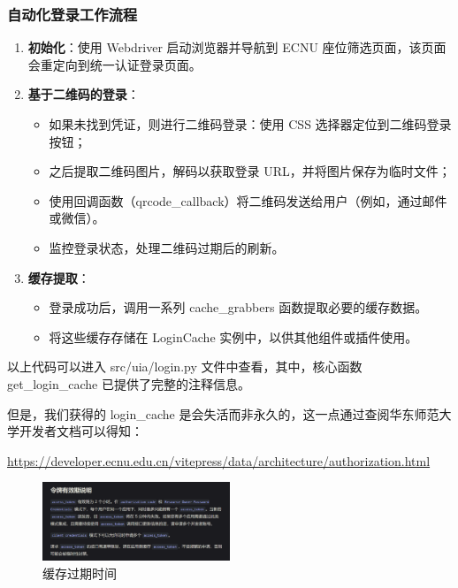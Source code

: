 \documentclass[14pt,a4paper,UTF8,twoside]{article}
\renewcommand{\texttt}[1]{{\color{blue}\ttfamily#1}}
\begin{document}
\subsubsection{自动化登录工作流程}

\begin{enumerate}
    \item \textbf{初始化}：使用 Webdriver 启动浏览器并导航到 ECNU 座位筛选页面，该页面会重定向到统一认证登录页面。
    
    \item \textbf{基于二维码的登录}：
    \begin{itemize}
        \item 如果未找到凭证，则进行二维码登录：使用 CSS 选择器定位到二维码登录按钮；
        \item 之后提取二维码图片，解码以获取登录 URL，并将图片保存为临时文件；
        \item 使用回调函数（\texttt{qrcode\_callback}）将二维码发送给用户（例如，通过邮件或微信）。
        \item 监控登录状态，处理二维码过期后的刷新。
    \end{itemize}
    
    \item \textbf{缓存提取}：
    \begin{itemize}
        \item 登录成功后，调用一系列 \texttt{cache\_grabbers} 函数提取必要的缓存数据。
        \item 将这些缓存存储在 \texttt{LoginCache} 实例中，以供其他组件或插件使用。
    \end{itemize}
\end{enumerate}

\begin{note}
以上代码可以进入 \texttt{src/uia/login.py} 文件中查看，其中，核心函数 \texttt{get\_login\_cache} 已提供了完整的注释信息。

但是，我们获得的 \texttt{login\_cache} 是会失活而非永久的，这一点通过查阅华东师范大学开发者文档可以得知：

\href{https://developer.ecnu.edu.cn/vitepress/data/architecture/authorization.html}{\underline{https://developer.ecnu.edu.cn/vitepress/data/architecture/authorization.html}}
\end{note}

\begin{figure}[H]
    \centering
    \includegraphics[width=0.5\textwidth]{img/open_platform.png}
    \caption{缓存过期时间}
    \label{fig:cache_expiration}
\end{figure}
\end{document}
